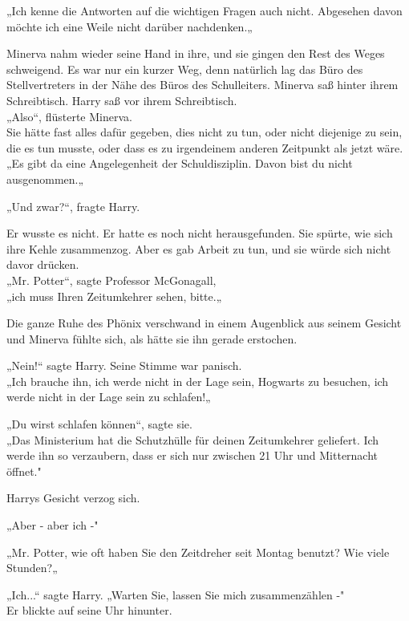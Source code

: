 {„Ich kenne die Antworten auf die wichtigen Fragen auch nicht. Abgesehen davon möchte ich eine Weile nicht darüber nachdenken.„

Minerva nahm wieder seine Hand in ihre, und sie gingen den Rest des Weges schweigend. Es war nur ein kurzer Weg, denn natürlich lag das Büro des Stellvertreters in der Nähe des Büros des Schulleiters. Minerva saß hinter ihrem Schreibtisch. Harry saß vor ihrem Schreibtisch.\\ „Also“, flüsterte Minerva.\\ Sie hätte fast alles dafür gegeben, dies nicht zu tun, oder nicht diejenige zu sein, die es tun musste, oder dass es zu irgendeinem anderen Zeitpunkt als jetzt wäre.\\ „Es gibt da eine Angelegenheit der Schuldisziplin. Davon bist du nicht ausgenommen.„

„Und zwar?“, fragte Harry.

Er wusste es nicht. Er hatte es noch nicht herausgefunden. Sie spürte, wie sich ihre Kehle zusammenzog. Aber es gab Arbeit zu tun, und sie würde sich nicht davor drücken.\\ „Mr. Potter“, sagte Professor McGonagall,\\ „ich muss Ihren Zeitumkehrer sehen, bitte.„

Die ganze Ruhe des Phönix verschwand in einem Augenblick aus seinem Gesicht und Minerva fühlte sich, als hätte sie ihn gerade erstochen.

„Nein!“ sagte Harry. Seine Stimme war panisch.\\ „Ich brauche ihn, ich werde nicht in der Lage sein, Hogwarts zu besuchen, ich werde nicht in der Lage sein zu schlafen!„

„Du wirst schlafen können“, sagte sie.\\ „Das Ministerium hat die Schutzhülle für deinen Zeitumkehrer geliefert. Ich werde ihn so verzaubern, dass er sich nur zwischen 21 Uhr und Mitternacht öffnet."

Harrys Gesicht verzog sich.

„Aber - aber ich -"

„Mr. Potter, wie oft haben Sie den Zeitdreher seit Montag benutzt? Wie viele Stunden?„

„Ich...“ sagte Harry. „Warten Sie, lassen Sie mich zusammenzählen -"\\ Er blickte auf seine Uhr hinunter.

}
